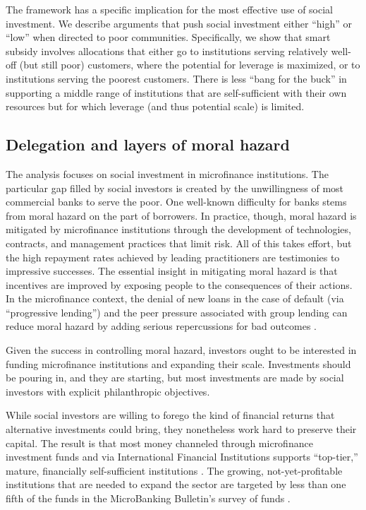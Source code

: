\documentclass[letterpaper, 12pt]{article}
\begin{document}
The framework has a specific implication for the most effective use of social investment. We describe arguments that push social investment
either ``high'' or ``low'' when directed to poor communities. Specifically, we show that smart subsidy involves allocations that either go to institutions serving relatively well-off (but still poor) customers, where the potential for leverage is maximized, or to institutions serving the poorest customers. There is less ``bang for the buck'' in supporting a middle range of institutions that are self-sufficient with their own resources but for which leverage (and thus potential scale) is limited.

\subsection{Delegation and layers of moral hazard}\label{two-layers-of-moral-hazard}

The analysis focuses on social investment in microfinance institutions. The particular gap filled by social investors is created by the
unwillingness of most commercial banks to serve the poor. One well-known difficulty for banks stems from moral hazard on the part of borrowers.
In practice, though, moral hazard is mitigated by microfinance institutions through the development of technologies, contracts, and management practices that limit risk. All of this takes effort, but the high repayment rates achieved by leading practitioners are testimonies to impressive successes. The essential insight in mitigating moral hazard is that incentives are improved by exposing people to the consequences of their actions. In the microfinance context, the denial of new loans in the case of default (via ``progressive lending'') and the peer pressure associated with group lending can reduce moral hazard by adding serious repercussions for bad outcomes \citep{armendariz2010}.


Given the success in controlling moral hazard, investors ought to be interested in funding microfinance institutions and expanding their
scale. Investments should be pouring in, and they are starting, but most investments are made by social investors with explicit philanthropic
objectives.

While social investors are willing to forego the kind of financial returns that alternative investments could bring, they nonetheless work
hard to preserve their capital. The result is that most money channeled through microfinance investment funds and via International Financial
Institutions supports ``top-tier,'' mature, financially self-sufficient institutions \citep{stauffenberg2007}. The growing, not-yet-profitable institutions that are needed to expand the sector are targeted by less than one fifth of the funds in the MicroBanking Bulletin's survey of funds \citep[][53]{bruett2005}.
\end{document}
